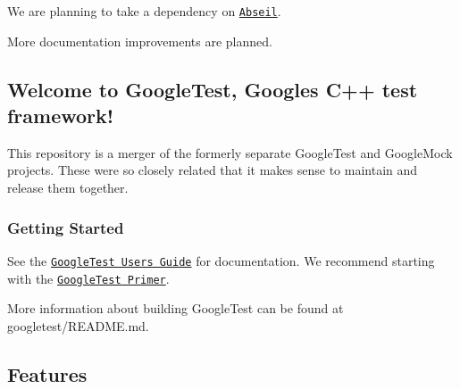 \begin{DoxyItemize}
\item We are planning to take a dependency on \href{https://github.com/abseil/abseil-cpp}{\tt Abseil}.
\item More documentation improvements are planned.
\end{DoxyItemize}

\subsection*{Welcome to {\bfseries Google\+Test}, Google\textquotesingle{}s C++ test framework!}

This repository is a merger of the formerly separate Google\+Test and Google\+Mock projects. These were so closely related that it makes sense to maintain and release them together.

\subsubsection*{Getting Started}

See the \href{https://google.github.io/googletest/}{\tt Google\+Test User\textquotesingle{}s Guide} for documentation. We recommend starting with the \href{https://google.github.io/googletest/primer.html}{\tt Google\+Test Primer}.

More information about building Google\+Test can be found at googletest/\+R\+E\+A\+D\+ME.md.

\subsection*{Features}


